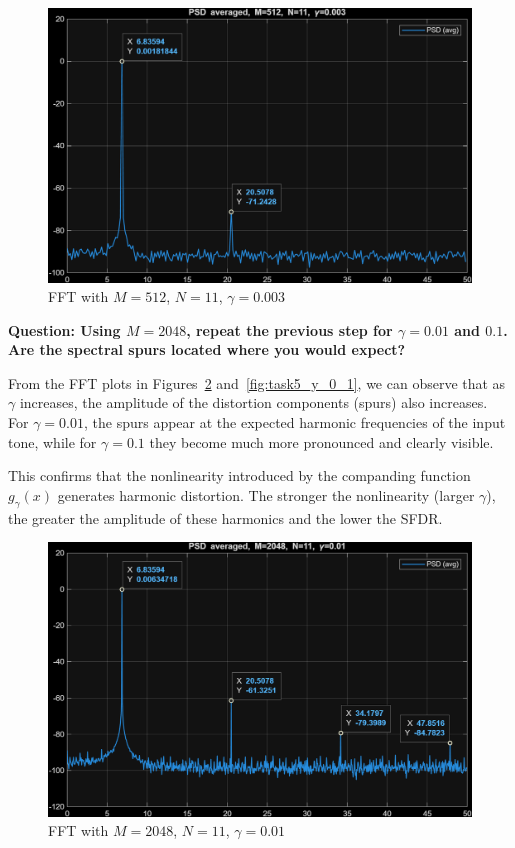 \begin{figure}[H]
    \centering
    \includegraphics[width=1\textwidth]{img/task5_512.png}
    \caption{FFT with $M=512$, $N=11$, $\gamma=0.003$}
    \label{fig:task5_512}
\end{figure}

\vspace{1cm}
\textbf{Question: Using $M=2048$, repeat the previous step for $\gamma = 0.01$ and $0.1$. Are the spectral spurs located where you would expect?
}
\vspace{0.5cm}

From the FFT plots in Figures~\ref{fig:task5_y_0_01} and~\ref{fig:task5_y_0_1}, we can observe that as $\gamma$ increases, the amplitude of the distortion components (spurs) also increases.
For $\gamma = 0.01$, the spurs appear at the expected harmonic frequencies of the input tone, while for $\gamma = 0.1$ they become much more pronounced and clearly visible.

This confirms that the nonlinearity introduced by the companding function $g_\gamma(x)$ generates harmonic distortion.
The stronger the nonlinearity (larger $\gamma$), the greater the amplitude of these harmonics and the lower the SFDR.

\begin{figure}[H]
    \centering
    \includegraphics[width=1\textwidth]{img/task5_y_0_01.png}
    \caption{FFT with $M=2048$, $N=11$, $\gamma=0.01$}
    \label{fig:task5_y_0_01}
\end{figure}

